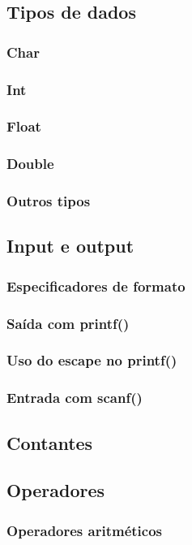 \documentclass{report}
\begin{document}
	\subsection{Tipos de dados}
	\subsubsection{Char}
	\subsubsection{Int}
	\subsubsection{Float}
	\subsubsection{Double}
	\subsubsection{Outros tipos}
	\subsection{Input e output}
	\subsubsection{Especificadores de formato}
	\subsubsection{Saída com printf()}
	\subsubsection{Uso do escape no printf()}
	\subsubsection{Entrada com scanf()}
	\subsection{Contantes}
	\subsection{Operadores}
	\subsubsection{Operadores aritméticos}
\end{document}
